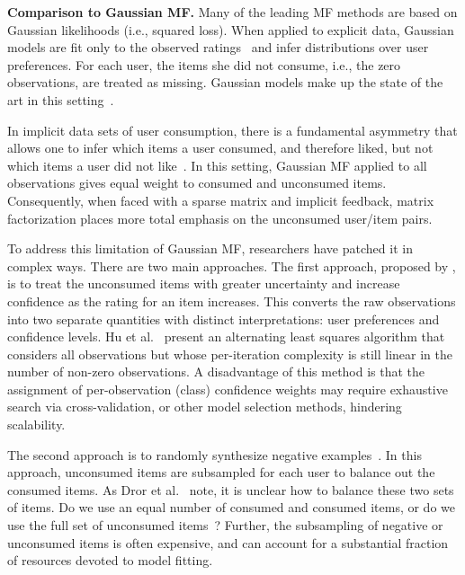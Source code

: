 {\bf Comparison to Gaussian MF.} Many of the leading MF methods are
based on Gaussian likelihoods (i.e., squared loss). When applied to
explicit data, Gaussian models are fit only to the observed
ratings~\cite{Koren:2009} and infer distributions over user
preferences. For each user, the items she did not consume, i.e., the
zero observations, are treated as missing. Gaussian models make up the
state of the art in this setting~\cite{Salakhutdinov:2008,
  Salakhutdinov:2008a,Koren:2009}.

In implicit data sets of user consumption, there is a fundamental
asymmetry that allows one to infer which items a user consumed, and
therefore liked, but not which items a user did not
like~\cite{Hu:2008p9402}. In this setting, Gaussian MF applied to all
observations gives equal weight to consumed and unconsumed items.
Consequently, when faced with a sparse matrix and implicit feedback,
matrix factorization places more total emphasis on the unconsumed
user/item pairs.

To address this limitation of Gaussian MF, researchers have patched it
in complex ways. There are two main approaches. The first approach,
proposed by \cite{Hu:2008p9402}, is to treat the unconsumed items with
greater uncertainty and increase confidence as the rating for an item
increases. This converts the raw observations into two separate
quantities with distinct interpretations: user preferences and
confidence levels. Hu et al.~\cite{Hu:2008p9402} present an
alternating least squares algorithm that considers all observations
but whose per-iteration complexity is still linear in the number of
non-zero observations. A disadvantage of this method is that the
assignment of per-observation (class) confidence weights may require exhaustive
search via cross-validation, or other model selection methods, 
hindering scalability.

The second approach is to randomly synthesize negative
examples~\cite{Dror:2012a, Gantner:2012p9364, Paquet:2013p9197}. In
this approach, unconsumed items are subsampled for each user to
balance out the consumed items. As Dror et al.~\cite{Dror:2012a} note,
it is unclear how to balance these two sets of items. Do we use an
equal number of consumed and consumed items, or do we use the full set
of unconsumed items~\cite{Cremonesi:2010, Hu:2008p9402}?  Further, the
subsampling of negative or unconsumed items is often expensive, and
can account for a substantial fraction of resources devoted to model
fitting.

